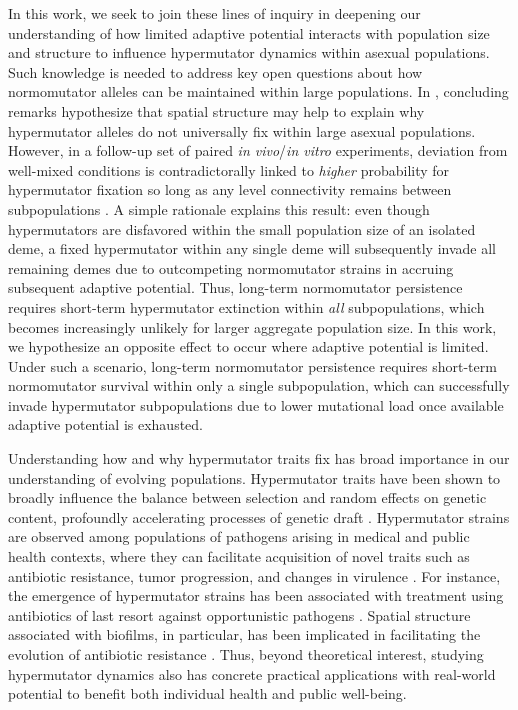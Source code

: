 In this work, we seek to join these lines of inquiry in deepening our understanding of how limited adaptive potential interacts with population size and structure to influence hypermutator dynamics within asexual populations.
Such knowledge is needed to address key open questions about how normomutator alleles can be maintained within large populations.
In \citep{raynes2018sign}, concluding remarks hypothesize that spatial structure may help to explain why hypermutator alleles do not universally fix within large asexual populations.
However, in a follow-up set of paired \textit{in vivo}/\textit{in vitro} experiments, deviation from well-mixed conditions is contradictorally linked to \textit{higher} probability for hypermutator fixation so long as any level connectivity remains between subpopulations \citep{raynes2019migration}.
A simple rationale explains this result: even though hypermutators are disfavored within the small population size of an isolated deme, a fixed hypermutator within any single deme will subsequently invade all remaining demes due to outcompeting normomutator strains in accruing subsequent adaptive potential.
Thus, long-term normomutator persistence requires short-term hypermutator extinction within \textit{all} subpopulations, which becomes increasingly unlikely for larger aggregate population size.
In this work, we hypothesize an opposite effect to occur where adaptive potential is limited.
Under such a scenario, long-term normomutator persistence requires short-term normomutator survival within only a single subpopulation, which can successfully invade hypermutator subpopulations due to lower mutational load once available adaptive potential is exhausted.

Understanding how and why hypermutator traits fix has broad importance in our understanding of evolving populations.
Hypermutator traits have been shown to broadly influence the balance between selection and random effects on genetic content, profoundly accelerating processes of genetic draft \citep{couce2017mutator}.
Hypermutator strains are observed among populations of pathogens arising in medical and public health contexts, where they can facilitate acquisition of novel traits such as antibiotic resistance, tumor progression, and changes in virulence \citep{eliopoulos2003hypermutation,jolivetgougeon2011bacterial,stern2016viral,schlesner2015hypermutation,hammerstrom2015acinetobacter,perron2010hypermutability}.
For instance, the emergence of hypermutator strains has been associated with treatment using antibiotics of last resort against opportunistic pathogens \citep{mehta2019essential}.
Spatial structure associated with biofilms, in particular, has been implicated in facilitating the evolution of antibiotic resistance \citep{france2018spatial}.
Thus, beyond theoretical interest, studying hypermutator dynamics also has concrete practical applications with real-world potential to benefit both individual health and public well-being.

